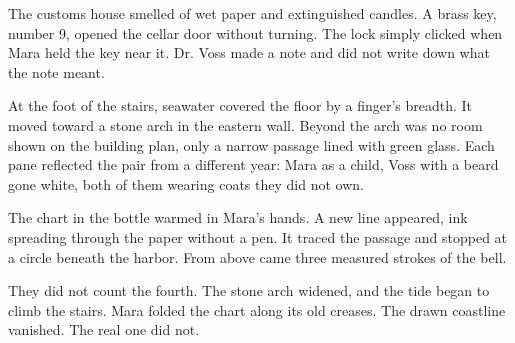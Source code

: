 The customs house smelled of wet paper and extinguished candles. A brass
key, number 9, opened the cellar door without turning. The lock simply
clicked when Mara held the key near it. Dr. Voss made a note and did not
write down what the note meant.

At the foot of the stairs, seawater covered the floor by a finger's breadth.
It moved toward a stone arch in the eastern wall. Beyond the arch was no
room shown on the building plan, only a narrow passage lined with green
glass. Each pane reflected the pair from a different year: Mara as a child,
Voss with a beard gone white, both of them wearing coats they did not own.

The chart in the bottle warmed in Mara's hands. A new line appeared, ink
spreading through the paper without a pen. It traced the passage and stopped
at a circle beneath the harbor. From above came three measured strokes of
the bell.

They did not count the fourth. The stone arch widened, and the tide began
to climb the stairs. Mara folded the chart along its old creases. The drawn
coastline vanished. The real one did not.

